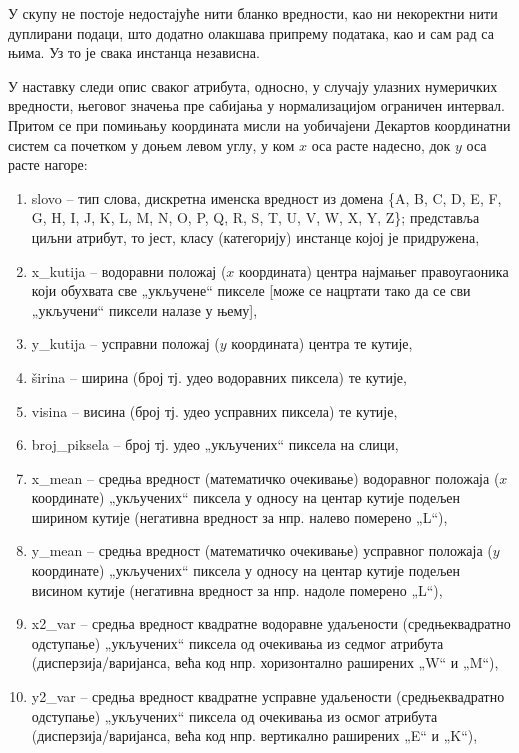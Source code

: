 \documentclass[a4paper]{article}
\begin{document}
У скупу не постоје недостајуће нити бланко вредности, као ни некоректни нити дуплирани подаци, што додатно олакшава припрему података, као и сам рад са њима. Уз то је свака инстанца независна.

У наставку следи опис сваког атрибута, односно, у случају улазних нумеричких вредности, његовог значења пре сабијања у нормализацијом ограничен интервал. Притом се при помињању координата мисли на уобичајени Декартов координатни систем са почетком у доњем левом углу, у ком $x$ оса расте надесно, док $y$ оса расте нагоре:

\begin{enumerate}
\item slovo -- тип слова, дискретна именска вредност из домена \{A, B, C, D, E, F, G, H, I, J, K, L, M, N, O, P, Q, R, S, T, U, V, W, X, Y, Z\}; представља циљни атрибут, то јест, класу (категорију) инстанце којој је придружена,
\item x\_kutija -- водоравни положај ($x$ координата) центра најмањег правоугаоника који обухвата све „укључене“ пикселе [може се нацртати тако да се сви „укључени“ пиксели налазе у њему],
\item y\_kutija -- усправни положај ($y$ координата) центра те кутије,
\item širina -- ширина (број тј. удео водоравних пиксела) те кутије,
\item visina -- висина (број тј. удео усправних пиксела) те кутије,
\item broj\_piksela -- број тј. удео „укључених“ пиксела на слици,
\item x\_mean -- средња вредност (математичко очекивање) водоравног положаја ($x$ координате) „укључених“ пиксела у односу на центар кутије подељен ширином кутије (негативна вредност за нпр. налево померено „L“),
\item y\_mean -- средња вредност (математичко очекивање) усправног положаја ($y$ координате) „укључених“ пиксела у односу на центар кутије подељен висином кутије (негативна вредност за нпр. надоле померено „L“),
\item x2\_var -- средња вредност квадратне водоравне удаљености (средњеквадратно одступање) „укључених“ пиксела од очекивања из седмог атрибута (дисперзија/варијанса, већа код нпр. хоризонтално раширених „W“ и „M“),
\item y2\_var -- средња вредност квадратне усправне удаљености (средњеквадратно одступање) „укључених“ пиксела од очекивања из осмог атрибута (дисперзија/варијанса, већа код нпр. вертикално раширених „E“ и „K“),

\end{enumerate}
\end{document}
